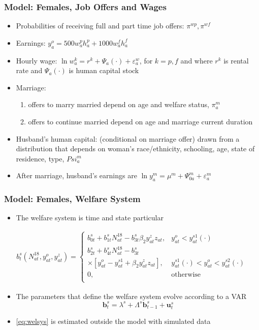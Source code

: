 \begin{frame}
	\frametitle{Model: Females, Job Offers and Wages}
	\begin{itemize}
		\item Probabilities of receiving full and part time job offers: $\pi^{wp}, \pi^{wf}$
		\item Earnings: $y_{a}^o = 500w_{a}^ph_{a}^p + 1000w_{a}^fh_{a}^f $
		\item Hourly wage: $\ln w_{a}^k = r^k + \Psi_{a}(\cdot) + \varepsilon_{a}^{w}$, for $k = p,f$ and where $r^k$ is rental rate and $\Psi_{a}(\cdot)$ is human capital stock
		\item Marriage: 
			\begin{enumerate}
			\item offers to marry married depend on age and welfare status, $\pi_{a}^m$
			\item offers to continue married depend on age and marriage current duration
			\end{enumerate}
		\item Husband's human capital: (conditional on marriage offer) drawn from a distribution that depends on woman's race/ethnicity, schooling, age, state of residence, type, $Psi_{a}^m$
		\item After marriage, husband's earnings are $\ln y_{a}^m = \mu^m + \Psi_{0a}^m + \varepsilon_{a}^m$ 					
		\end{itemize}
\end{frame}

\begin{frame}
	\frametitle{Model: Females, Welfare System}
	\begin{itemize}
		\item The welfare system is time and state particular
	\end{itemize}
	\begin{eqnarray}
b_{t}^s \left( N_{at}^{18}, y_{at}^o, y_{at}^z \right) =
\begin{cases}
b_{0t}^s + b_{1t}^s N_{at}^{18} - b_{3t}^s \beta_{2} y_{at}^z z_{at}, & y_{at}^o < y_{at}^{s1}(\cdot) \nonumber \\
b_{2t}^s + b_{4t}^s N_{at}^{18} - b_{3t}^s & \nonumber \\
\times \left[ y_{at}^o - y_{at}^{s1} + \beta_{2} y_{at}^z z_{at} \right] , & y_{at}^{s1}(\cdot) < y_{at}^o < y_{at}^{s2}(\cdot) \nonumber \\
0, & \text{otherwise} \nonumber \\
\end{cases}
	\end{eqnarray}
	\begin{itemize}
	\item The parameters that define the welfare system evolve according to a VAR
		\begin{equation}
		\mathbf{b}_{t}^s = \lambda^s + \Lambda^s \mathbf{b}_{t-1}^s + \mathbf{u}_{t}^s \label{eq:welsys}
		\end{equation}
	 \item \eqref{eq:welsys} is estimated outside the model with simulated data
	\end{itemize}
\end{frame}


